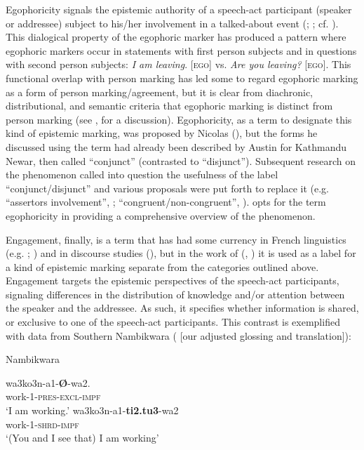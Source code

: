 \documentclass[output=paper]{langsci/langscibook}
\begin{document}
Egophoricity signals the epistemic authority of a speech-act participant (speaker or addressee) subject to his/her involvement in a talked-about event (\citealt{Bergqvist2018}; \citealt{BergqvistKittila2017}; cf. \citealt{Hargreaves2005}). This dialogical property of the egophoric marker has produced a pattern where egophoric markers occur in statements with first person subjects and in questions with second person subjects: \textit{I am leaving}. [\textsc{ego}] vs. \textit{Are you leaving?} [\textsc{ego}]. This functional overlap with person marking has led some to regard egophoric marking as a form of person marking/agreement, but it is clear from diachronic, distributional, and semantic criteria that egophoric marking is distinct from person marking (see \citealt{BergqvistKittila2017}, for a discussion). Egophoricity, as a term to designate this kind of epistemic marking, was proposed by Nicolas \citeauthor{Tournadre1996} (\citeyear[201]{Tournadre1996}), but the forms he discussed using the term had already been described by Austin \cite{Hale1980} for Kathmandu Newar, then called “conjunct” (contrasted to “disjunct”). Subsequent research on the phenomenon called into question the usefulness of the label “conjunct/disjunct” and various proposals were put forth to replace it (e.g. “assertors involvement”, \citealt{Creissels2008}; “congruent/non-congruent”, \citealt{Dickinson2000}). \cite{SanRoqueetal2018} opts for the term egophoricity in providing a comprehensive overview of the phenomenon. 

Engagement, finally, is a term that has had some currency in French linguistics (e.g. \citealt{Descles2009}; \citealt{Guentcheva2011}) and in discourse studies (\citealt{Hyland2005}), but in the work of \citeauthor{Evansetal2017a} (\citeyear{Evansetal2017a}, \citeyear{Evansetal2017b}) it is used as a label for a kind of epistemic marking separate from the categories outlined above. Engagement targets the epistemic perspectives of the speech-act participants, signaling differences in the distribution of knowledge and/or attention between the speaker and the addressee. As such, it specifies whether information is shared, or exclusive to one of the speech-act participants. This contrast is exemplified with data from Southern Nambikwara (\citealt[63--64]{Kroeker2001} [our adjusted glossing and translation]):

\begin{exe}
\ex Nambikwara \label{ex:hb1}
	\begin{xlist}
	\ex 
	\gll wa3ko3n-a1-\textbf{Ø}-wa2.\\
	work-1-\textsc{pres}-\textsc{excl}-\textsc{impf}\\
	\trans ‘I am working.’ 
	\ex 
	\gll wa3ko3n-a1-\textbf{ti2.tu3}-wa2\\
	work-1-\textsc{shrd}-\textsc{impf}\\
	\trans ‘(You and I see that) I am working’ 	
	\end{xlist}
\end{exe}
\end{document}
